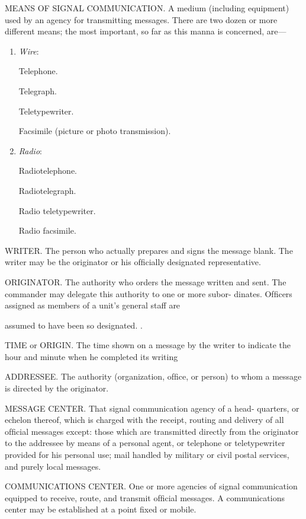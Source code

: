 \mypara MEANS OF SIGNAL COMMUNICATION. A medium (including equipment) used by an agency for transmitting messages. There are two
dozen or more different means; the most important, so far as this manna
is concerned, are—

\begin{enumerate}
\item \textit{Wire}:

Telephone.

Telegraph.

Teletypewriter.

Facsimile (picture or photo transmission).

\item \textit{Radio}:

Radiotelephone.

Radiotelegraph.

Radio teletypewriter.

Radio facsimile.

\end{enumerate}

\mypara WRITER. The person who actually prepares and signs the message
blank. The writer may be the originator or his ofﬁcially designated
representative.

\mypara ORIGINATOR. The authority who orders the message written and
sent. The commander may delegate this authority to one or more subor-
dinates. Ofﬁcers assigned as members of a unit’s general staff are

assumed to have been so designated. .

\mypara TIME or ORIGIN. The time shown on a message by the writer to
indicate the hour and minute when he completed its writing

\mypara ADDRESSEE. The authority (organization, ofﬁce, or person) to whom
a message is directed by the originator.

\mypara MESSAGE CENTER. That signal communication agency of a head-
quarters, or echelon thereof, which is charged with the receipt, routing
and delivery of all ofﬁcial messages except: those which are transmitted
directly from the originator to the addressee by means of a personal
agent, or telephone or teletypewriter provided for his personal use; mail
handled by military or civil postal services, and purely local messages.

\mypara COMMUNICATIONS CENTER. One or more agencies of signal communication equipped to receive, route, and transmit ofﬁcial messages. A
communications center may be established at a point ﬁxed or mobile.

